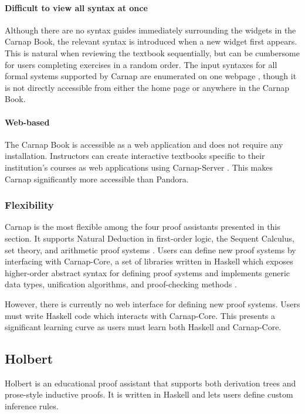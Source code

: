 \paragraph{Difficult to view all syntax at once}
Although there are no syntax guides immediately surrounding the widgets in the Carnap Book, the relevant syntax is introduced when a new widget first appears. This is natural when reviewing the textbook sequentially, but can be cumbersome for users completing exercises in a random order. The input syntaxes for all formal systems supported by Carnap are enumerated on one webpage \cite{carnap:systems}, though it is not directly accessible from either the home page or anywhere in the Carnap Book.

\paragraph{Web-based} The Carnap Book is accessible as a web application \cite{carnap:book} and does not require any installation. Instructors can create interactive textbooks specific to their institution's courses as web applications using Carnap-Server \cite{carnap:2018}. This makes Carnap significantly more accessible than Pandora.

\subsubsection{Flexibility}
Carnap is the most flexible among the four proof assistants presented in this section. It supports Natural Deduction in first-order logic, the Sequent Calculus, set theory, and arithmetic proof systems \cite{carnap:systems}. Users can define new proof systems by interfacing with Carnap-Core, a set of libraries written in Haskell which exposes higher-order abstract syntax for defining proof systems and implements generic data types, unification algorithms, and proof-checking methods \cite{carnap:2018}.

However, there is currently no web interface for defining new proof systems. Users must write Haskell code which interacts with Carnap-Core. This presents a significant learning curve as users must learn both Haskell and Carnap-Core.

\subsection{Holbert}
Holbert \cite{oconnor:2022} is an educational proof assistant that supports both derivation trees and prose-style inductive proofs. It is written in Haskell and lets users define custom inference rules.

